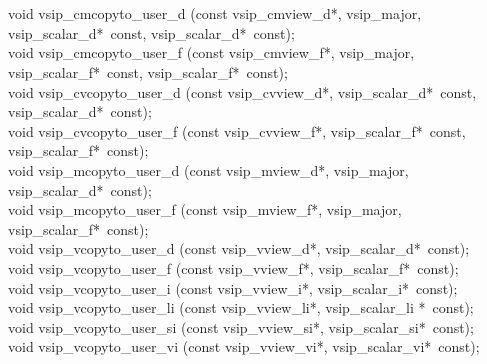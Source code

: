 \\\cvsiplh
\\\begin{cfuncs}
void vsip\_cmcopyto\_user\_d (const vsip\_cmview\_d*, vsip\_major, vsip\_scalar\_d*~const, vsip\_scalar\_d*~const);\\
void vsip\_cmcopyto\_user\_f (const vsip\_cmview\_f*, vsip\_major, vsip\_scalar\_f*~const, vsip\_scalar\_f*~const);\\
void vsip\_cvcopyto\_user\_d (const vsip\_cvview\_d*, vsip\_scalar\_d*~const, vsip\_scalar\_d*~const);\\
void vsip\_cvcopyto\_user\_f (const vsip\_cvview\_f*, vsip\_scalar\_f*~const, vsip\_scalar\_f*~const);\\
void vsip\_mcopyto\_user\_d (const vsip\_mview\_d*, vsip\_major, vsip\_scalar\_d*~const);\\
void vsip\_mcopyto\_user\_f (const vsip\_mview\_f*, vsip\_major, vsip\_scalar\_f*~const);\\
void vsip\_vcopyto\_user\_d (const vsip\_vview\_d*, vsip\_scalar\_d*~const);\\
void vsip\_vcopyto\_user\_f (const vsip\_vview\_f*, vsip\_scalar\_f*~const);\\
void vsip\_vcopyto\_user\_i (const vsip\_vview\_i*, vsip\_scalar\_i*~const);\\
void vsip\_vcopyto\_user\_li (const vsip\_vview\_li*, vsip\_scalar\_li *~const);\\
void vsip\_vcopyto\_user\_si (const vsip\_vview\_si*, vsip\_scalar\_si*~const);\\
void vsip\_vcopyto\_user\_vi (const vsip\_vview\_vi*, vsip\_scalar\_vi*~const);\\
\end{cfuncs}
\pyjvsiph
%
%
%
